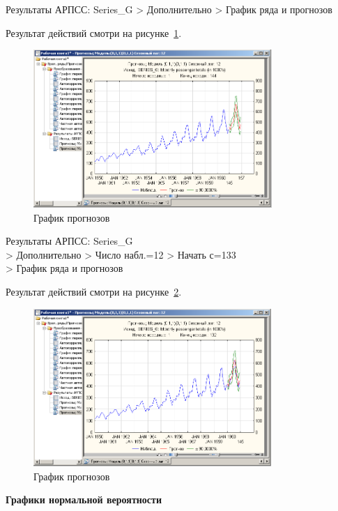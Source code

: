 Результаты АРПСС: Series\_G
> Дополнительно > График ряда и прогнозов

Результат действий смотри на рисунке~\ref{fig:15}.

\begin{figure}[!h]
  \centering

  \includegraphics[height=6cm]
  {inc/15.PNG}

  \caption{График прогнозов}

  \label{fig:15}
\end{figure}

\newpage

Результаты АРПСС: Series\_G\\
> Дополнительно
> Число набл.=12
> Начать с=133\\
> График ряда и прогнозов

Результат действий смотри на рисунке~\ref{fig:16}.

\begin{figure}[!h]
  \centering

  \includegraphics[height=6cm]
  {inc/16.PNG}

  \caption{График прогнозов}

  \label{fig:16}
\end{figure}

\begin{center}
  \textbf{Графики нормальной вероятности}
\end{center}

